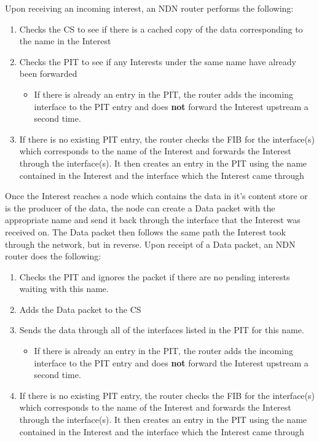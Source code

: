 Upon receiving an incoming interest, an NDN router performs the following:
\begin{enumerate}
    \item Checks the CS to see if there is a cached copy of the data corresponding to the name in the Interest
    \item Checks the PIT to see if any Interests under the same name have already been forwarded
    \begin{itemize}
        \item If there is already an entry in the PIT, the router adds the incoming interface to the PIT entry and does \textbf{not} forward the Interest upstream a second time.
    \end{itemize}
    \item If there is no existing PIT entry, the router checks the FIB for the interface(s) which corresponds to the name of the Interest and forwards the Interest through the interface(s). It then creates an entry in the PIT using the name contained in the Interest and the interface which the Interest came through  
\end{enumerate}



Once the Interest reaches a node which contains the data in it's content store or is the producer of the data, the node can create a Data packet with the appropriate name and send it back through the interface that the Interest was received on. The Data packet then follows the same path the Interest took through the network, but in reverse. Upon receipt of a Data packet, an NDN router does the following:

\begin{enumerate}
    \item Checks the PIT and ignores the packet if there are no pending interests waiting with this name. 
    \item Adds the Data packet to the CS
    \item Sends the data through all of the interfaces listed in the PIT for this name.
    \begin{itemize}
        \item If there is already an entry in the PIT, the router adds the incoming interface to the PIT entry and does \textbf{not} forward the Interest upstream a second time.
    \end{itemize}
    \item If there is no existing PIT entry, the router checks the FIB for the interface(s) which corresponds to the name of the Interest and forwards the Interest through the interface(s). It then creates an entry in the PIT using the name contained in the Interest and the interface which the Interest came through  
\end{enumerate}

